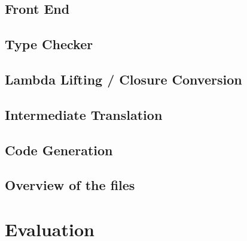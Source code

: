 \documentclass[12pt,twoside,notitlepage]{report}
\begin{document}



\section{Front End}

\section{Type Checker}

\section{Lambda Lifting / Closure Conversion}

\section{Intermediate Translation}

\section{Code Generation}

\section{Overview of the files}

\clearpage
\chapter{Evaluation}
\end{document}
